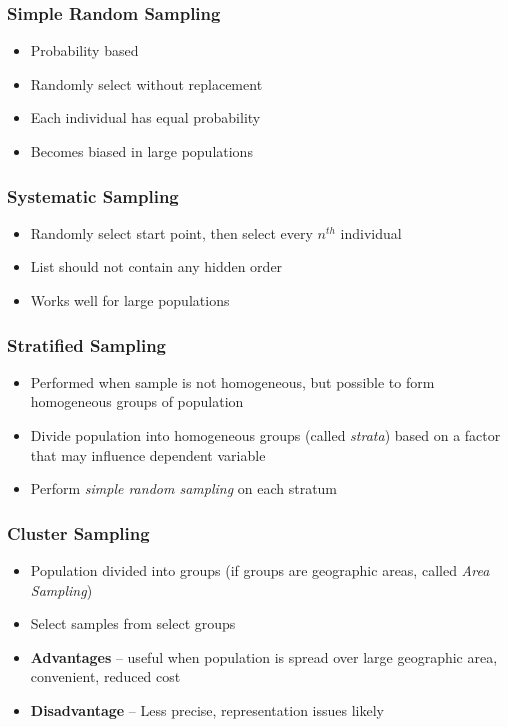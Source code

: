 \documentclass{article}
\begin{document}
\subsubsection{Simple Random Sampling}
\begin{itemize}
    \item Probability based
    \item Randomly select without replacement
    \item Each individual has equal probability
    \item Becomes biased in large populations
\end{itemize}

\subsubsection{Systematic Sampling}
\begin{itemize}
    \item Randomly select start point, then select every $n^{th}$ individual
    \item List should not contain any hidden order
    \item Works well for large populations
\end{itemize}

\subsubsection{Stratified Sampling}
\begin{itemize}
    \item Performed when sample is not homogeneous, but possible to form homogeneous groups of population
    \item Divide population into homogeneous groups (called \textit{strata}) based on a factor that may influence dependent variable
    \item Perform \textit{simple random sampling} on each stratum
\end{itemize}

\subsubsection{Cluster Sampling}
\begin{itemize}
    \item Population divided into groups (if groups are geographic areas, called \textit{Area Sampling})
    \item Select samples from select groups
    \item \textbf{Advantages} -- useful when population is spread over large geographic area, convenient, reduced cost
    \item \textbf{Disadvantage} -- Less precise, representation issues likely
\end{itemize}
\end{document}
